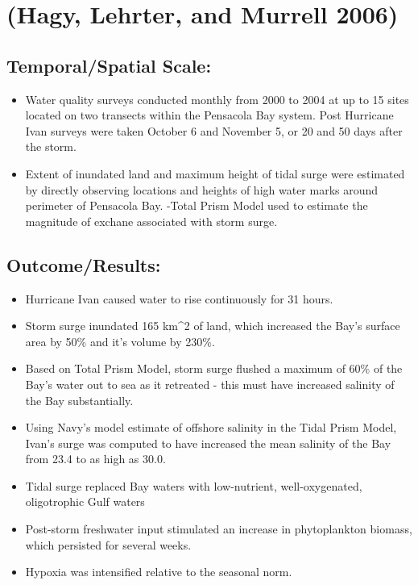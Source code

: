 \documentclass[
]{article}
\providecommand{\tightlist}{%
  \setlength{\itemsep}{0pt}\setlength{\parskip}{0pt}}
\begin{document}
\hypertarget{hagy2006effects}{%
\section{(Hagy, Lehrter, and Murrell 2006)}\label{hagy2006effects}}

\hypertarget{temporalspatial-scale}{%
\subsection{Temporal/Spatial Scale:}\label{temporalspatial-scale}}

\begin{itemize}
\tightlist
\item
  Water quality surveys conducted monthly from 2000 to 2004 at up to 15
  sites located on two transects within the Pensacola Bay system. Post
  Hurricane Ivan surveys were taken October 6 and November 5, or 20 and
  50 days after the storm.\\
\item
  Extent of inundated land and maximum height of tidal surge were
  estimated by directly observing locations and heights of high water
  marks around perimeter of Pensacola Bay. -Total Prism Model used to
  estimate the magnitude of exchane associated with storm surge.
\end{itemize}

\hypertarget{outcomeresults}{%
\subsection{Outcome/Results:}\label{outcomeresults}}

\begin{itemize}
\tightlist
\item
  Hurricane Ivan caused water to rise continuously for 31 hours.
\item
  Storm surge inundated 165 km\^{}2 of land, which increased the Bay's
  surface area by 50\% and it's volume by 230\%.
\item
  Based on Total Prism Model, storm surge flushed a maximum of 60\% of
  the Bay's water out to sea as it retreated - this must have increased
  salinity of the Bay substantially.
\item
  Using Navy's model estimate of offshore salinity in the Tidal Prism
  Model, Ivan's surge was computed to have increased the mean salinity
  of the Bay from 23.4 to as high as 30.0.
\item
  Tidal surge replaced Bay waters with low-nutrient, well-oxygenated,
  oligotrophic Gulf waters
\item
  Post-storm freshwater input stimulated an increase in phytoplankton
  biomass, which persisted for several weeks.
\item
  Hypoxia was intensified relative to the seasonal norm.
\end{itemize}
\end{document}
